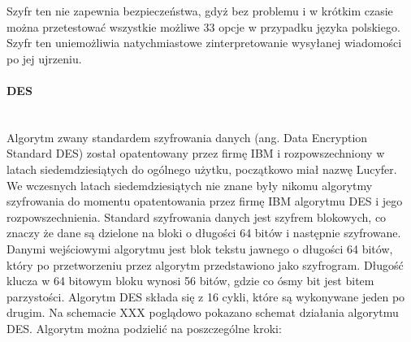 \documentclass[12p]{article}
\begin{document}
Szyfr ten nie zapewnia bezpieczeństwa, gdyż bez problemu i w krótkim czasie można przetestować wszystkie możliwe 33 opcje w przypadku języka polskiego. Szyfr ten uniemożliwia natychmiastowe zinterpretowanie wysyłanej wiadomości po jej ujrzeniu.

\paragraph{DES}\mbox{} \\

Algorytm zwany standardem szyfrowania danych (ang. Data Encryption Standard DES) został opatentowany przez firmę IBM i rozpowszechniony w latach siedemdziesiątych do ogólnego użytku, początkowo miał nazwę Lucyfer. We wczesnych latach siedemdziesiątych nie znane były nikomu algorytmy szyfrowania do momentu opatentowania przez firmę IBM algorytmu DES i jego rozpowszechnienia. Standard szyfrowania danych jest szyfrem blokowych, co znaczy że dane są dzielone na bloki o długości 64 bitów i następnie szyfrowane. Danymi wejściowymi algorytmu jest blok tekstu jawnego o długości 64 bitów, który po przetworzeniu przez algorytm przedstawiono jako szyfrogram. Długość klucza w 64 bitowym bloku wynosi 56 bitów, gdzie co ósmy bit jest bitem parzystości. Algorytm DES składa się z 16 cykli, które są wykonywane jeden po drugim. Na schemacie XXX poglądowo pokazano schemat działania algorytmu DES. Algorytm można podzielić na poszczególne kroki:
\end{document}
